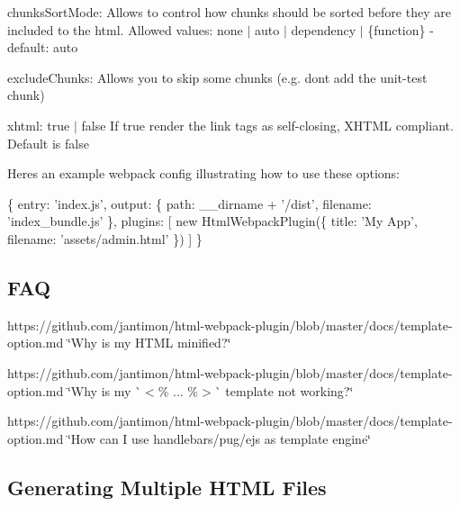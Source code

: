 \begin{DoxyItemize}
\item {\ttfamily chunks\+Sort\+Mode}\+: Allows to control how chunks should be sorted before they are included to the html. Allowed values\+: \textquotesingle{}none\textquotesingle{} $\vert$ \textquotesingle{}auto\textquotesingle{} $\vert$ \textquotesingle{}dependency\textquotesingle{} $\vert$ \{function\} -\/ default\+: \textquotesingle{}auto\textquotesingle{}
\item {\ttfamily exclude\+Chunks}\+: Allows you to skip some chunks (e.\+g. don\textquotesingle{}t add the unit-\/test chunk)
\item {\ttfamily xhtml}\+: {\ttfamily true $\vert$ false} If {\ttfamily true} render the {\ttfamily link} tags as self-\/closing, X\+H\+T\+ML compliant. Default is {\ttfamily false}
\end{DoxyItemize}

Here\textquotesingle{}s an example webpack config illustrating how to use these options\+: 
\begin{DoxyCode}
\{
  entry: 'index.js',
  output: \{
    path: \_\_dirname + '/dist',
    filename: 'index\_bundle.js'
  \},
  plugins: [
    new HtmlWebpackPlugin(\{
      title: 'My App',
      filename: 'assets/admin.html'
    \})
  ]
\}
\end{DoxyCode}


\subsection*{F\+AQ }


\begin{DoxyItemize}
\item https\+://github.com/jantimon/html-\/webpack-\/plugin/blob/master/docs/template-\/option.\+md \char`\"{}\+Why is my H\+T\+M\+L minified?\char`\"{}
\item https\+://github.com/jantimon/html-\/webpack-\/plugin/blob/master/docs/template-\/option.\+md \char`\"{}\+Why is my \`{}$<$\% ... \%$>$\`{} template not working?\char`\"{}
\item https\+://github.com/jantimon/html-\/webpack-\/plugin/blob/master/docs/template-\/option.\+md \char`\"{}\+How can I use handlebars/pug/ejs as template engine\char`\"{}
\end{DoxyItemize}

\subsection*{Generating Multiple H\+T\+ML Files }

